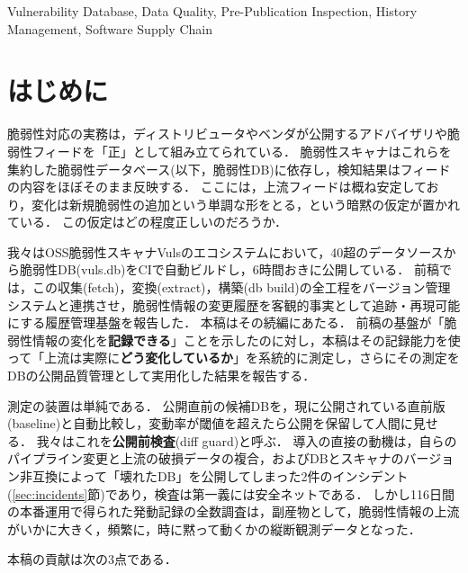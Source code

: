 \documentclass{css}
\begin{document}
\begin{ekeyword}
Vulnerability Database, Data Quality, Pre-Publication Inspection, History Management, Software Supply Chain
\end{ekeyword}

\maketitle

\section{はじめに}
\label{sec:intro}

脆弱性対応の実務は，ディストリビュータやベンダが公開するアドバイザリや脆弱性フィードを「正」として組み立てられている．
脆弱性スキャナはこれらを集約した脆弱性データベース(以下，脆弱性DB)に依存し，検知結果はフィードの内容をほぼそのまま反映する．
ここには，上流フィードは概ね安定しており，変化は新規脆弱性の追加という単調な形をとる，という暗黙の仮定が置かれている．
この仮定はどの程度正しいのだろうか．

我々はOSS脆弱性スキャナVuls\cite{vuls}のエコシステムにおいて，40超のデータソースから脆弱性DB(vuls.db)をCIで自動ビルドし，6時間おきに公開している．
前稿\cite{nakaoka2025}では，この収集(fetch)，変換(extract)，構築(db build)の全工程をバージョン管理システムと連携させ，脆弱性情報の変更履歴を客観的事実として追跡・再現可能にする履歴管理基盤を報告した．
本稿はその続編にあたる．
前稿の基盤が「脆弱性情報の変化を\textbf{記録できる}」ことを示したのに対し，本稿はその記録能力を使って「上流は実際に\textbf{どう変化しているか}」を系統的に測定し，さらにその測定をDBの公開品質管理として実用化した結果を報告する．

測定の装置は単純である．
公開直前の候補DBを，現に公開されている直前版(baseline)と自動比較し，変動率が閾値を超えたら公開を保留して人間に見せる．
我々はこれを\textbf{公開前検査}(diff guard)と呼ぶ．
導入の直接の動機は，自らのパイプライン変更と上流の破損データの複合，およびDBとスキャナのバージョン非互換によって「壊れたDB」を公開してしまった2件のインシデント(\ref{sec:incidents}節)であり，検査は第一義には安全ネットである．
しかし116日間の本番運用で得られた発動記録の全数調査は，副産物として，脆弱性情報の上流がいかに大きく，頻繁に，時に黙って動くかの縦断観測データとなった．

本稿の貢献は次の3点である．
\end{document}

